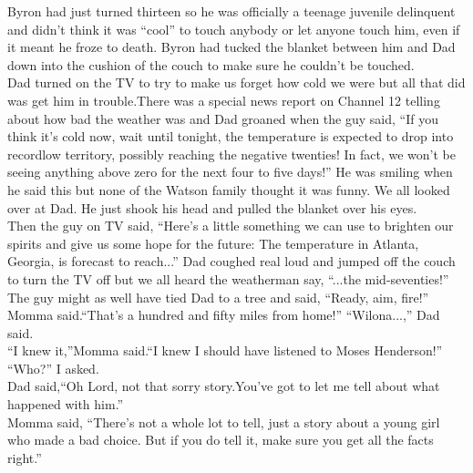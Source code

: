 \documentclass{standard}
\begin{document}
Byron had just turned thirteen so he was officially a teenage juvenile delinquent and didn’t think it was “cool” to touch anybody or let anyone touch him, even if it meant he froze to death. Byron had tucked the blanket between him and Dad down into the cushion of the couch to make sure he couldn’t be touched.\\

Dad turned on the TV to try to make us forget how cold we were but all that did was get him in trouble.There was a special news report on Channel 12 telling about how bad the weather was and Dad groaned when the guy said, “If you think it’s cold now, wait until tonight, the temperature is expected to drop into recordlow territory, possibly reaching the negative twenties! In fact, we won’t be seeing anything above zero for the next four to five days!” He was smiling when he said this but none of the Watson family thought it was funny. We all looked over at Dad. He just shook his head and pulled the blanket over his eyes.\\

Then the guy on TV said, “Here’s a little something we can use to brighten our spirits and give us some hope for the future: The temperature in Atlanta, Georgia, is forecast to reach...” Dad coughed real loud and jumped off the couch to turn the TV off but we all heard the weatherman say, “...the mid-seventies!” The guy might as well have tied Dad to a tree and said, “Ready, aim, fire!”\\

Momma said.“That’s a hundred and fifty miles from home!” “Wilona...,” Dad said.\\

“I knew it,”Momma said.“I knew I should have listened to Moses Henderson!”\\

“Who?” I asked.\\

Dad said,“Oh Lord, not that sorry story.You’ve got to let me tell about what happened with him.”\\

Momma said, “There’s not a whole lot to tell, just a story about a young girl who made a bad choice. But if you do tell it, make sure you get all the facts right.”\\
\end{document}
